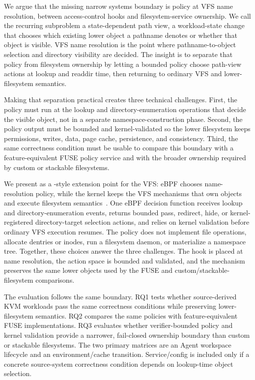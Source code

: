 We argue that the missing narrow systems boundary is policy at VFS name
resolution, between access-control hooks and filesystem-service ownership. We
call the recurring subproblem a state-dependent path view, a workload-state
change that chooses which existing lower object a pathname denotes or whether
that object is visible. VFS name resolution is the point where
pathname-to-object selection and directory visibility are decided. The insight
is to separate that policy from filesystem ownership by letting a bounded
policy choose path-view actions at lookup and readdir time, then returning to
ordinary VFS and lower-filesystem semantics.

Making that separation practical creates three technical challenges. First, the
policy must run at the lookup and directory-enumeration operations that decide
the visible object, not in a separate namespace-construction phase. Second, the
policy output must be bounded and kernel-validated so the lower filesystem keeps
permissions, writes, data, page cache, persistence, and consistency. Third, the
same correctness condition must be usable to compare this boundary with a
feature-equivalent FUSE policy service and with the broader ownership required
by custom or stackable filesystems.

We present \namei as a -style extension point for the VFS:
eBPF chooses name-resolution policy, while the kernel keeps the VFS mechanisms
that own objects and execute filesystem semantics~\cite{linux_sched_ext}. One
eBPF decision function receives lookup and directory-enumeration events,
returns bounded pass, redirect, hide, or kernel-registered directory-target
selection actions, and relies on kernel validation before ordinary VFS
execution resumes.
The policy does not implement file operations, allocate dentries or inodes, run
a filesystem daemon, or materialize a namespace tree. Together, these choices
answer the three challenges. The hook is placed at name resolution, the action
space is bounded and validated, and the mechanism preserves the same lower
objects used by the FUSE and custom/stackable-filesystem comparisons.

The evaluation follows the same boundary. RQ1 tests whether source-derived KVM
workloads pass the same correctness conditions while preserving lower-filesystem
semantics. RQ2 compares the same policies with feature-equivalent FUSE
implementations. RQ3 evaluates whether verifier-bounded policy and kernel
validation provide a narrower, fail-closed ownership boundary than custom or
stackable filesystems. The two primary matrices are an Agent workspace
lifecycle and an environment/cache transition. Service/config is included only
if a concrete source-system correctness condition depends on lookup-time object
selection.

